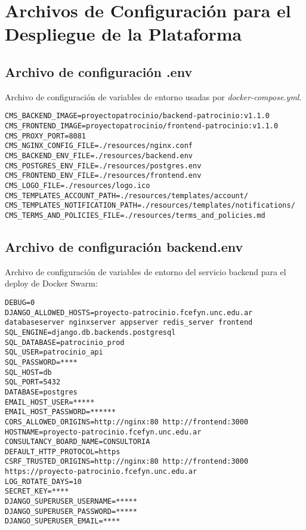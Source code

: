 \chapter{Archivos de Configuración para el Despliegue de la Plataforma}\label{cap:apendix-configfile-deloy}

\section{Archivo de configuración \textbf{.env}}\label{sec:anexo:configfile-env}
Archivo de configuración de variables de entorno usadas por \textit{docker-compose.yml}.
\begin{lstlisting}[caption={Archivo de configuración .env}, label={cod:.env}, captionpos=b]
CMS_BACKEND_IMAGE=proyectopatrocinio/backend-patrocinio:v1.1.0
CMS_FRONTEND_IMAGE=proyectopatrocinio/frontend-patrocinio:v1.1.0
CMS_PROXY_PORT=8081
CMS_NGINX_CONFIG_FILE=./resources/nginx.conf
CMS_BACKEND_ENV_FILE=./resources/backend.env
CMS_POSTGRES_ENV_FILE=./resources/postgres.env
CMS_FRONTEND_ENV_FILE=./resources/frontend.env
CMS_LOGO_FILE=./resources/logo.ico
CMS_TEMPLATES_ACCOUNT_PATH=./resources/templates/account/
CMS_TEMPLATES_NOTIFICATION_PATH=./resources/templates/notifications/
CMS_TERMS_AND_POLICIES_FILE=./resources/terms_and_policies.md
\end{lstlisting}



\section{Archivo de configuración \textbf{backend.env}}\label{sec:anexo:configfile-backend-env}
Archivo de configuración de variables de entorno del servicio backend para el deploy de Docker Swarm:

\begin{lstlisting}[caption={Archivo de configuración backend.env}, label={cod:backend.env}, captionpos=b]
DEBUG=0
DJANGO_ALLOWED_HOSTS=proyecto-patrocinio.fcefyn.unc.edu.ar databaseserver nginxserver appserver redis_server frontend
SQL_ENGINE=django.db.backends.postgresql
SQL_DATABASE=patrocinio_prod
SQL_USER=patrocinio_api
SQL_PASSWORD=****
SQL_HOST=db
SQL_PORT=5432
DATABASE=postgres
EMAIL_HOST_USER=*****
EMAIL_HOST_PASSWORD=******
CORS_ALLOWED_ORIGINS=http://nginx:80 http://frontend:3000
HOSTNAME=proyecto-patrocinio.fcefyn.unc.edu.ar
CONSULTANCY_BOARD_NAME=CONSULTORIA
DEFAULT_HTTP_PROTOCOL=https
CSRF_TRUSTED_ORIGINS=http://nginx:80 http://frontend:3000 https://proyecto-patrocinio.fcefyn.unc.edu.ar
LOG_ROTATE_DAYS=10
SECRET_KEY=****
DJANGO_SUPERUSER_USERNAME=*****
DJANGO_SUPERUSER_PASSWORD=*****
DJANGO_SUPERUSER_EMAIL=****
\end{lstlisting}


